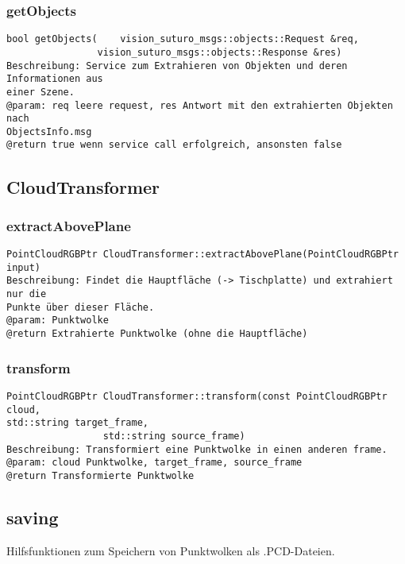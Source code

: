 \documentclass{suturo}
\begin{document}
\subsubsection{getObjects}
\begin{verbatim}
bool getObjects(	vision_suturo_msgs::objects::Request &req, 
			    vision_suturo_msgs::objects::Response &res)
Beschreibung: Service zum Extrahieren von Objekten und deren Informationen aus
einer Szene.
@param: req leere request, res Antwort mit den extrahierten Objekten nach
ObjectsInfo.msg
@return true wenn service call erfolgreich, ansonsten false
\end{verbatim}\label{func:getobjects}


\subsection*{CloudTransformer}

\subsubsection{extractAbovePlane}
\begin{verbatim}
PointCloudRGBPtr CloudTransformer::extractAbovePlane(PointCloudRGBPtr input)
Beschreibung: Findet die Hauptfläche (-> Tischplatte) und extrahiert nur die
Punkte über dieser Fläche.
@param: Punktwolke
@return Extrahierte Punktwolke (ohne die Hauptfläche)
\end{verbatim}\label{func:extractaboveplane}
\subsubsection{transform}
\begin{verbatim}
PointCloudRGBPtr CloudTransformer::transform(const PointCloudRGBPtr cloud,
std::string target_frame,
                 std::string source_frame)
Beschreibung: Transformiert eine Punktwolke in einen anderen frame.
@param: cloud Punktwolke, target_frame, source_frame
@return Transformierte Punktwolke
\end{verbatim}\label{func:transform}

\subsection*{saving}
Hilfsfunktionen zum Speichern von Punktwolken als .PCD-Dateien.
\end{document}
